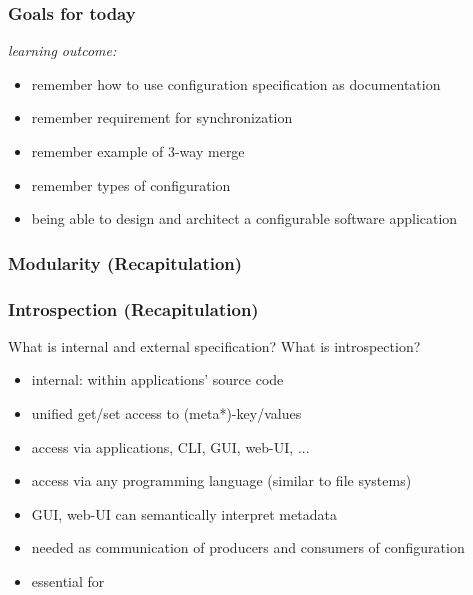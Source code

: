 \begin{frame}
	\frametitle{Goals for today}
	\textit{learning outcome:}
	\begin{itemize}
	\item remember how to use configuration specification as documentation
	\item remember requirement for synchronization
	\item remember example of 3-way merge
	\item remember types of configuration
	\item being able to design and architect a configurable software application
	\end{itemize}
\end{frame}








\begin{frame}
	\frametitle{Modularity (Recapitulation)}
	\pause
	\Large
\end{frame}


\begin{frame}
	\frametitle{Introspection (Recapitulation)}
	\begin{task}
	What is internal and external specification?
	What is introspection?
	\end{task}

	\pause
	\vspace{1em}

	\begin{itemize}
	\item internal: within applications' source code
	\item unified get/set access to (meta*)-key/values
	\item access via applications, CLI, GUI, web-UI, ...
	\item access via any programming language (similar to file systems)
	\item GUI, web-UI can semantically interpret metadata
	\item needed as communication of producers and consumers of configuration
	\item essential for ~\citet{holland2001nofutz}
	\end{itemize}
\end{frame}

